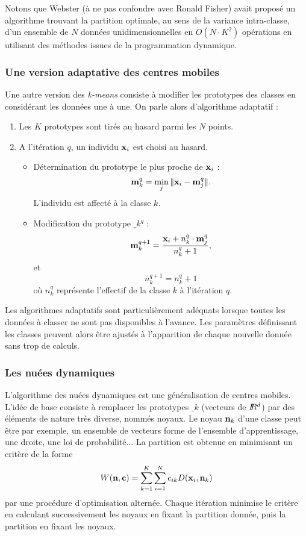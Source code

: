 Notons que Webster  (\`a ne pas confondre avec Ronald Fisher)
avait propos\'e un algorithme trouvant la partition optimale,
au sens de la variance intra-classe, d'un ensemble de $N$ donn\'ees
unidimensionnelles en $O(N \cdot K^2)$ op\'erations en utilisant des m\'ethodes
issues de la programmation dynamique.  



\subsubsection{Une version adaptative des centres mobiles}

Une autre version des {\em k-means} \cite{Macqueen1967} consiste \`a modifier
les prototypes des classes en consid\'erant les donn\'ees une \`a une.
On parle alors d'algorithme adaptatif :
 

\begin{enumerate}
\item Les $K$ prototypes sont tir\'es au hasard parmi les $N$ points.
\item A l'it\'eration $q$, un individu $\mbox{\bf x}_i$ est choisi au hasard.
\begin{itemize}
\item D\'etermination du prototype le plus proche de $\mbox{\bf x}_i$ :
\[
\mbox{\bf m}_k^q=\min_j{\|\mbox{\bf x}_i - \mbox{\bf m}_j^q \|}.
\]
L'individu est affect\'e \`a la classe $k$.
\item Modification du prototype $\bm_k^q$ :
\[
\mbox{\bf m}_k^{q+1}=\frac{\mbox{\bf x}_i + n_k^q \cdot \mbox{\bf m}_j^q}{n_k^q +1},
\]
et
\[
n_k^{q+1}=n_k^q +1
\]
o\`u $n_k^q$ repr\'esente l'effectif de la classe $k$ \`a l'it\'eration $q$.
\end{itemize}
\end{enumerate}


Les algorithmes adaptatifs sont particuli\`erement ad\'equats lorsque
toutes les donn\'ees \`a classer ne sont pas disponibles \`a l'avance.
Les param\`etres d\'efinissant les classes peuvent alors \^etre
ajust\'es \`a l'apparition de chaque nouvelle donn\'ee sans trop de 
calculs. 

\subsubsection{Les nu\'ees dynamiques}

L'algorithme des nu\'ees dynamiques \cite{Diday1971} est une g\'en\'eralisation 
de centres mobiles. L'id\'ee de base consiste \`a remplacer les prototypes
$\bm_k$ (vecteurs de $I\!\!R^d$) par des \'el\'ements de  nature tr\`es diverse, 
nomm\'es noyaux. Le noyau $\mbox{\bf n}_k$ d'une classe peut \^etre par exemple, un ensemble
de vecteurs forme de l'ensemble d'apprentissage, une droite, une loi de
probabilit\'e... La partition est obtenue en minimisant un crit\`ere
de la forme
\begin{equation}
W(\mbox{\bf n},\mbox{\bf c})=\sum_{k=1}^K \sum_{i=1}^N c_{ik} D(\mbox{\bf x}_i ,\mbox{\bf n}_k )
\end{equation}
par une proc\'edure d'optimisation altern\'ee. Chaque it\'eration minimise
le crit\`ere en calculant successivement les noyaux en fixant la  partition
donn\'ee, puis la partition en fixant les noyaux.  
   

